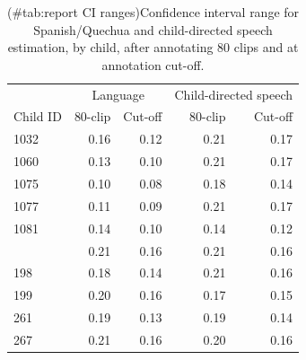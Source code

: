 \documentclass[
]{article}
\begin{document}
\begin{table}[!h]

\caption{(\#tab:report CI ranges)Confidence interval range for Spanish/Quechua and child-directed speech estimation, by child, after annotating 80 clips and at annotation cut-off.}
\centering
\begin{tabular}[t]{lrrrr}
\toprule
\multicolumn{1}{c}{ } & \multicolumn{2}{c}{Language} & \multicolumn{2}{c}{Child-directed speech} \\
\cmidrule(l{3pt}r{3pt}){2-3} \cmidrule(l{3pt}r{3pt}){4-5}
Child ID & 80-clip & Cut-off & 80-clip & Cut-off\\
\midrule
1032 & 0.16 & 0.12 & 0.21 & 0.17\\
1060 & 0.13 & 0.10 & 0.21 & 0.17\\
1075 & 0.10 & 0.08 & 0.18 & 0.14\\
1077 & 0.11 & 0.09 & 0.21 & 0.17\\
1081 & 0.14 & 0.10 & 0.14 & 0.12\\
\addlinespace
179 & 0.21 & 0.16 & 0.21 & 0.16\\
198 & 0.18 & 0.14 & 0.21 & 0.16\\
199 & 0.20 & 0.16 & 0.17 & 0.15\\
261 & 0.19 & 0.13 & 0.19 & 0.14\\
267 & 0.21 & 0.16 & 0.20 & 0.16\\
\bottomrule
\end{tabular}
\end{table}
\end{document}
